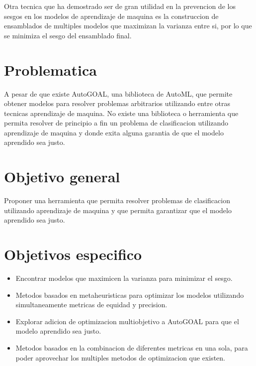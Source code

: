 Otra tecnica que ha demostrado ser de gran utilidad en la prevencion de los sesgos en los modelos de aprendizaje de maquina es la construccion de ensamblados de multiples modelos que maximizan la varianza entre si, por lo que se minimiza el sesgo del ensamblado final.

\section*{Problematica}

A pesar de que existe AutoGOAL, una biblioteca de AutoML, que permite obtener modelos para resolver problemas arbitrarios utilizando entre otras tecnicas aprendizaje de maquina. No existe una biblioteca o herramienta que permita resolver de principio a fin un problema de clasificacion utilizando aprendizaje de maquina y donde exita alguna garantia de que el modelo aprendido sea justo.

\section*{Objetivo general}

Proponer una herramienta que permita resolver problemas de clasificacion utilizando aprendizaje de maquina y que permita garantizar que el modelo aprendido sea justo.

\section*{Objetivos especifico}

\begin{itemize}
    \item Encontrar modelos que maximicen la varianza para minimizar el sesgo.
    \item Metodos basados en metaheuristicas para optimizar los modelos utilizando simultaneamente metricas de equidad y precision.
    \item Explorar adicion de optimizacion multiobjetivo a AutoGOAL para que el modelo aprendido sea justo.
    \item Metodos basados en la combinacion de diferentes metricas en una sola, para poder aprovechar los multiples metodos de optimizacion que existen.
\end{itemize}
